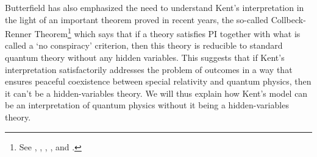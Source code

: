 Butterfield has also emphasized the need to understand Kent's interpretation in the light of an important theorem proved in recent years, the so-called Collbeck-Renner Theorem\footnote{See \cite{LeegwaterGijs2016Aitf}, \cite{ColbeckRoger2011Neoq}, \cite{ColbeckRoger2012Tcoq}, \cite{LandsmanK2015OtCt}, and \cite{Landsman}.} which says that if a theory satisfies PI together with what is called a `no conspiracy' criterion, then this theory is reducible to standard quantum theory without any hidden variables. This suggests that if Kent's interpretation satisfactorily addresses the problem of outcomes in a way that  ensures peaceful coexistence between special relativity and quantum physics, then it can't be a hidden-variables theory. We will thus explain how Kent's model can be an interpretation of quantum physics without it being a hidden-variables theory.